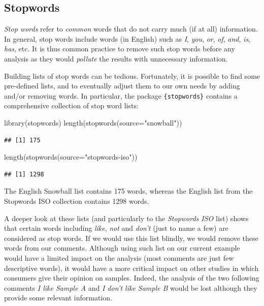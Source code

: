 \documentclass[
]{krantz}
\makeatletter
\newenvironment{Shaded}{\begin{snugshade}}{\end{snugshade}}
\newcommand{\AttributeTok}[1]{\textcolor[rgb]{0.61,0.61,0.61}{#1}}
\newcommand{\FunctionTok}[1]{\textcolor[rgb]{0,0,0}{#1}}
\newcommand{\NormalTok}[1]{#1}
\newcommand{\StringTok}[1]{\textcolor[rgb]{0.5,0.5,0.5}{#1}}
\newenvironment{kframe}{%
\medskip{}
\setlength{\fboxsep}{.8em}
 \def\at@end@of@kframe{}%
 \ifinner\ifhmode%
  \def\at@end@of@kframe{\end{minipage}}%
  \begin{minipage}{\columnwidth}%
 \fi\fi%
 \def\FrameCommand##1{\hskip\@totalleftmargin \hskip-\fboxsep
 \colorbox{shadecolor}{##1}\hskip-\fboxsep
     \hskip-\linewidth \hskip-\@totalleftmargin \hskip\columnwidth}%
 \MakeFramed {\advance\hsize-\width
   \@totalleftmargin\z@ \linewidth\hsize
   \@setminipage}}%
 {\par\unskip\endMakeFramed%
 \at@end@of@kframe}
\renewenvironment{Shaded}{\begin{kframe}}{\end{kframe}}
\makeatother
\begin{document}
\hypertarget{stopwords}{%
\subsection{Stopwords}\label{stopwords}}

\emph{Stop words} refer to \emph{common} words that do not carry much (if at all) information. In general, stop words include words (in English) such as \emph{I}, \emph{you}, \emph{or}, \emph{of}, \emph{and}, \emph{is}, \emph{has}, etc. It is thus common practice to remove such stop words before any analysis as they would \emph{pollute} the results with unnecessary information.

Building lists of stop words can be tedious. Fortunately, it is possible to find some pre-defined lists, and to eventually adjust them to our own needs by adding and/or removing words. In particular, the package \texttt{\{stopwords\}} contains a comprehensive collection of stop word lists:

\begin{Shaded}
\begin{Highlighting}[]
\FunctionTok{library}\NormalTok{(stopwords)}
\FunctionTok{length}\NormalTok{(}\FunctionTok{stopwords}\NormalTok{(}\AttributeTok{source=}\StringTok{"snowball"}\NormalTok{))}
\end{Highlighting}
\end{Shaded}

\begin{verbatim}
## [1] 175
\end{verbatim}

\begin{Shaded}
\begin{Highlighting}[]
\FunctionTok{length}\NormalTok{(}\FunctionTok{stopwords}\NormalTok{(}\AttributeTok{source=}\StringTok{"stopwords{-}iso"}\NormalTok{))}
\end{Highlighting}
\end{Shaded}

\begin{verbatim}
## [1] 1298
\end{verbatim}

The English Snowball list contains 175 words, whereas the English list from the Stopwords ISO collection contains 1298 words.

A deeper look at these lists (and particularly to the \emph{Stopwords ISO} list) shows that certain words including \emph{like}, \emph{not} and \emph{don't} (just to name a few) are considered as stop words. If we would use this list blindly, we would remove these words from our comments. Although using such list on our current example would have a limited impact on the analysis (most comments are just few descriptive words), it would have a more critical impact on other studies in which consumers give their opinion on samples. Indeed, the analysis of the two following comments \emph{I like Sample A} and \emph{I don't like Sample B} would be lost although they provide some relevant information.
\end{document}
